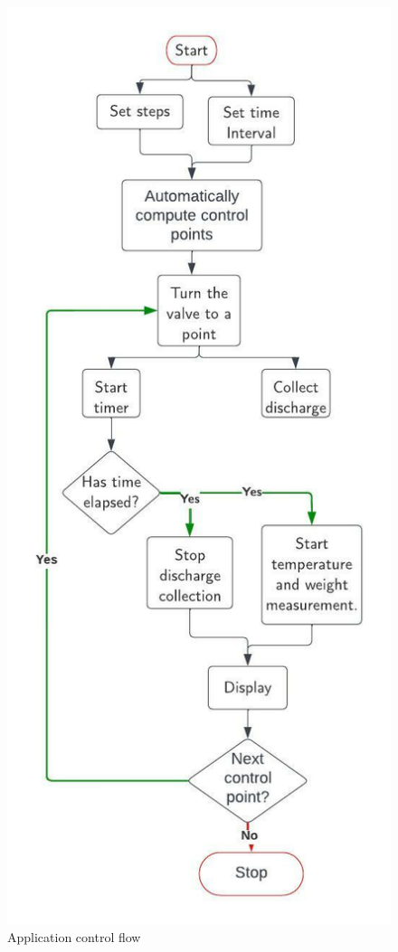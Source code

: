 \begin{itemize}
     \begin{figure}[H]
         \centering
         \includegraphics{Figures/Control flow..jpeg}
         \caption{Application control flow}
         \label{fig:control_flow}
     \end{figure}
     
\end{itemize}

